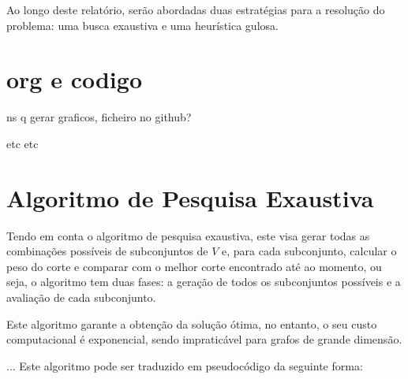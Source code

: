 \documentclass[mirror]{revdetua}
\begin{document}
Ao longo deste relatório, serão abordadas duas estratégias para a resolução do problema: uma busca exaustiva e uma heurística gulosa.


\section{org e codigo}

ns q gerar graficos, ficheiro no github?

etc etc

\section{Algoritmo de Pesquisa Exaustiva}

Tendo em conta o algoritmo de pesquisa exaustiva, este visa gerar todas as combinações possíveis de subconjuntos de $V$ e, para cada subconjunto, calcular o peso do corte e comparar com o melhor corte encontrado até ao momento, ou seja, o algoritmo tem duas fases: a geração de todos os subconjuntos possíveis e a avaliação de cada subconjunto.

Este algoritmo garante a obtenção da solução ótima, no entanto, o seu custo computacional é exponencial, sendo impraticável para grafos de grande dimensão.

... Este algoritmo pode ser traduzido em pseudocódigo da seguinte forma:

\begin{comment}
De acordo com o problema, todos os vértices que estão em
S, não estão em T. Assim, o conjunto T é formado pelos
restantes vértices. Dado estes dois subconjuntos, é
possível para cada um deles calcular o peso do corte para
cada possibilidade com a função calculate-weight-cut.

Para fazer as combinações de vértices possíveis, foi utilizado a livraria itertools que contém um método de combinações, gerando automaticamente todas as combinações possíveis para o conjunto S (possible cuts).

É de notar que a função combinations é itertools.combinations(input\_set, r) e a função calculate\_cut\_weight é a função que calcula o peso do corte entre os subconjuntos $S$ e $T$. OU ALGO ASSIM idk
\end{comment}
\end{document}
